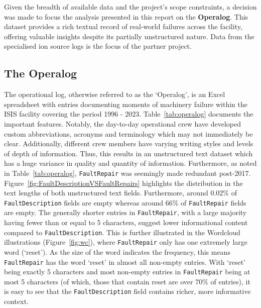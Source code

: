 \documentclass[10pt,oneside]{report}
\begin{document}
Given the breadth of available data and the project's scope constraints, a decision was made to focus the analysis presented in this report on the \textbf{Operalog}. This dataset provides a rich textual record of real-world failures across the facility, offering valuable insights despite its partially unstructured nature. Data from the specialised ion source logs is the focus of the partner project. 

\subsection{The Operalog}
The operational log, otherwise referred to as the `Operalog', is an Excel spreadsheet with entries documenting moments of machinery failure within the ISIS facility covering the period 1996 - 2023. Table~\ref{tab:operalog} documents the important features. Notably, the day-to-day operational crew have developed custom abbreviations, acronyms and terminology which may not immediately be clear. Additionally, different crew members have varying writing styles and levels of depth of information. Thus, this results in an unstructured text dataset which has a huge variance in quality and quantity of information. Furthermore, as noted in Table~\ref{tab:operalog}, \texttt{FaultRepair} was seemingly made redundant post-2017. Figure~\ref{fig:FaultDescriptionVSFaultRepairs} highlights the distribution in the text lengths of both unstructured text fields. Furthermore, around $0.02\%$ of \texttt{FaultDescription} fields are empty whereas around $66\%$ of \texttt{FaultRepair} fields are empty. The generally shorter entries in \texttt{FaultRepair}, with a large majority having fewer than or equal to 5 characters, suggest lower informational content compared to \texttt{FaultDescription}. This is further illustrated in the Wordcloud illustrations \cite{oesper2011wordcloud} (Figure~\ref{fig:wc}), where \texttt{FaultRepair} only has one extremely large word (`reset'). As the size of the word indicates the frequency, this means \texttt{FaultRepair} has the word `reset' in almost all non-empty entries. With `reset' being exactly 5 characters and most non-empty entries in \texttt{FaultRepair} being at most 5 characters (of which, those that contain reset are over 70\% of entries), it is easy to see that the \texttt{FaultDescription} field contains richer, more informative context. 
\end{document}
